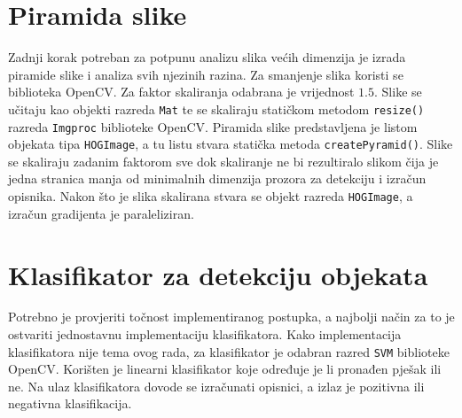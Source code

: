 \documentclass[times, utf8, zavrsni]{fer}
\begin{document}
\section{Piramida slike}
Zadnji korak potreban za potpunu analizu slika većih dimenzija je izrada piramide slike i analiza svih njezinih razina. Za smanjenje slika koristi se biblioteka OpenCV. Za faktor skaliranja odabrana je vrijednost \(1.5\). Slike se učitaju kao objekti razreda \verb|Mat| te se skaliraju statičkom metodom \verb|resize()| razreda \verb|Imgproc| biblioteke OpenCV. Piramida slike predstavljena je listom objekata tipa \verb|HOGImage|, a tu listu stvara statička metoda \verb|createPyramid()|. Slike se skaliraju zadanim faktorom sve dok skaliranje ne bi rezultiralo slikom čija je jedna stranica manja od minimalnih dimenzija prozora za detekciju i izračun opisnika. Nakon što je slika skalirana stvara se objekt razreda \verb|HOGImage|, a izračun gradijenta je paraleliziran.

\section{Klasifikator za detekciju objekata}
Potrebno je provjeriti točnost implementiranog postupka, a najbolji način za to je ostvariti jednostavnu implementaciju klasifikatora. Kako implementacija klasifikatora nije tema ovog rada, za klasifikator je odabran razred \verb|SVM| biblioteke OpenCV. Korišten je linearni klasifikator koje određuje je li pronađen pješak ili ne. Na ulaz klasifikatora dovode se izračunati opisnici, a izlaz je pozitivna ili negativna klasifikacija.
\end{document}

